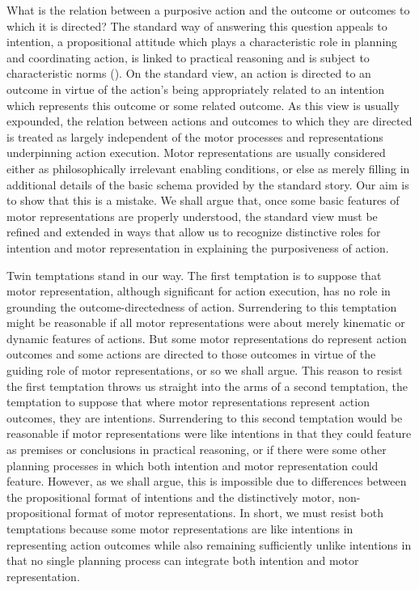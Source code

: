 \documentclass[12pt,\papersize]{extarticle}
\begin{document}
What is the relation between a purposive action and the outcome or outcomes to which it is directed? The standard way of answering this question appeals to intention, a propositional attitude which plays a characteristic role in planning and coordinating action, is linked to practical reasoning and is subject to characteristic norms (\citealp{Bratman:1987xw}).  On the standard view, an action is directed to an outcome in virtue of the action's being appropriately related to an intention which represents this outcome or some related outcome. As this view is usually expounded, the relation between actions and outcomes to which they are directed is treated as largely independent of the motor processes and representations underpinning action execution. Motor representations are usually considered either as philosophically irrelevant enabling conditions, or else as merely filling in additional details of the basic schema provided by the standard story. Our aim is to show that this is a mistake. We shall argue that, once some basic features of motor representations are properly understood, the standard view must be  refined and extended in ways that allow us to recognize distinctive roles for intention and motor representation in explaining the purposiveness of action.

Twin temptations stand in our way. The first temptation is to suppose that motor representation, although significant  for action execution, has no role in grounding the outcome-directedness of action. Surrendering to this temptation might be reasonable if all motor representations were about merely kinematic or dynamic features of actions. But some motor representations do represent action outcomes and some actions are directed to those outcomes in virtue of the guiding role of motor representations, or so we shall argue. This reason to resist the first temptation throws us straight into the arms of a second temptation, the temptation to suppose that where motor representations represent action outcomes, they are intentions. Surrendering to this second temptation would be reasonable if motor representations were like intentions in that they could feature as premises or conclusions in practical reasoning, or if there were some other planning processes in which both intention and motor representation could feature. However, as we shall argue, this is impossible due to differences between the propositional format of intentions and the distinctively motor, non-propositional format of motor representations.  In short, we must resist both temptations because some motor representations are like intentions in representing action outcomes while also remaining sufficiently unlike intentions in that no single planning process can integrate both intention and motor representation.  
\end{document}
